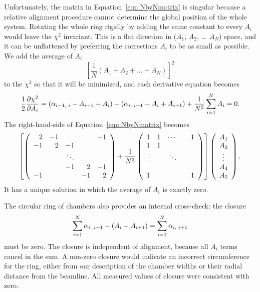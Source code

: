 Unfortunately, the matrix in Equation~\ref{eqn:NbyNmatrix} is singular
because a relative alignment procedure cannot determine the global
position of the whole system.  Rotating the whole ring rigidly by
adding the same constant to every $A_i$ would leave the $\chi^2$
invariant.  This is a flat direction in ($A_1$, $A_2$, \ldots\ $A_N$)
space, and it can be unflattened by preferring the corrections $A_i$
to be as small as possible.  We add the average of $A_i$
\begin{equation}
\left[ \frac{1}{N} \left(A_1 + A_2 + \ldots + A_N\right) \right]^2
\label{eqn:average}
\end{equation}
to the $\chi^2$ so that it will be minimized, and each derivative
equation becomes
\begin{equation}
\frac{1}{2} \frac{\partial \chi^2}{\partial A_i} = (\alpha_{i-1\mbox{\scriptsize, }i} - A_{i-1} + A_i) - (\alpha_{i\mbox{\scriptsize, }i+1} - A_i + A_{i+1}) + \frac{1}{N^2} \sum_{i=1}^N A_i = 0 \mbox{.}
\end{equation}
The right-hand-side of Equation~\ref{eqn:NbyNmatrix} becomes
\begin{equation}
\left[\left(\begin{array}{r r r r r}
2 & -1 &  &  & -1 \\
-1 & 2 & -1 &  &  \\
 & & \ddots & &  \\
 &  & -1 & 2 & -1 \\
-1 &  &  & -1 & 2
\end{array}\right)
+
\frac{1}{N^2}
\left(\begin{array}{r r r r r}
1 & 1 & \cdots &   & 1 \\
1 & 1 &   &   &   \\
\vdots &   & \ddots &   &   \\
  &   &   &   &   \\
1 &   &   &   & 1
\end{array}\right)
\right]
\left(\begin{array}{c}
A_1 \\
A_2 \\
\vdots \\
A_4 \\
A_5 \\
\end{array} \right)\mbox{.}
\label{eqn:solution}
\end{equation}
It has a unique solution in which the average of $A_i$ is exactly
zero.

The circular ring of chambers also provides an internal cross-check:
the closure
\begin{equation}
\sum_{i=1}^N \alpha_{i\mbox{\scriptsize, }i+1} - (A_i - A_{i+1}) = \sum_{i=1}^N \alpha_{i\mbox{\scriptsize, }i+1}
\end{equation}
must be zero.  The closure is independent of alignment, because all
$A_i$ terms cancel in the sum.  A non-zero closure would indicate an
incorrect circumference for the ring, either from our description of
the chamber widths or their radial distance from the beamline.  All
measured values of closure were consistent with zero.

